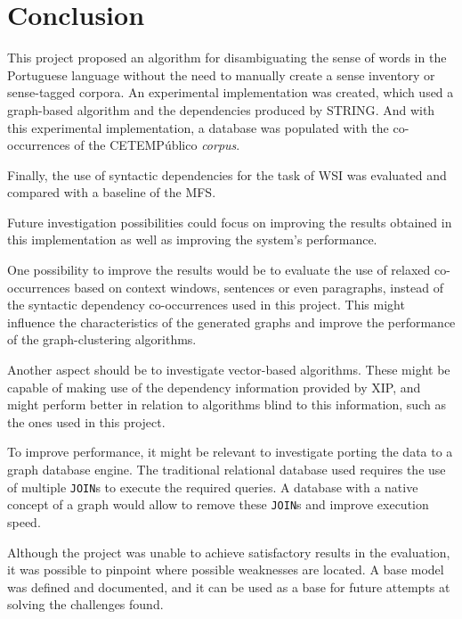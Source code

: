 \chapter{Conclusion}
\label{ch:conclusion}

This project proposed an algorithm for disambiguating the sense of words in the
Portuguese language without the need to manually create a sense inventory or
sense-tagged corpora. An experimental implementation was created, which used a
graph-based algorithm and the dependencies produced by \ac{STRING}. And with
this experimental implementation, a database was populated with the
co-occurrences of the CETEMPúblico \textit{corpus}.

Finally, the use of syntactic dependencies for the task of \ac{WSI} was
evaluated and compared with a baseline of the \ac{MFS}.

Future investigation possibilities could focus on improving the results obtained
in this implementation as well as improving the system's performance.

One possibility to improve the results would be to evaluate the use of relaxed
co-occurrences based on context windows, sentences or even paragraphs, instead
of the syntactic dependency co-occurrences used in this project. This might
influence the characteristics of the generated graphs and improve the
performance of the graph-clustering algorithms.

Another aspect should be to investigate vector-based algorithms. These might be
capable of making use of the dependency information provided by \ac{XIP}, and
might perform better in relation to algorithms blind to this
information, such as the ones used in this project.

To improve performance, it might be relevant to investigate porting the data to
a graph database engine. The traditional relational database used requires the
use of multiple \texttt{JOIN}s to execute the required queries. A database with
a native concept of a graph would allow to remove these \texttt{JOIN}s and
improve execution speed.

Although the project was unable to achieve satisfactory results in the
evaluation, it was possible to pinpoint where possible weaknesses are located.
A base model was defined and documented, and it can be used as a base for future
attempts at solving the challenges found.

